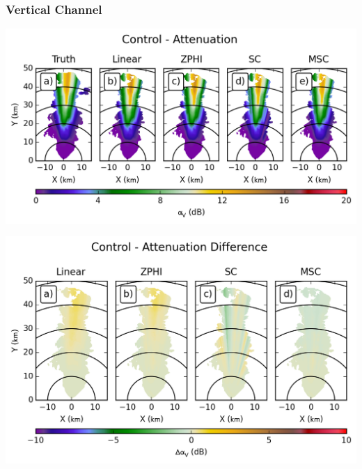 \documentclass[red]{beamer}
\begin{document}
\subsubsection{Vertical Channel}
\begin{frame}
    \begin{center}
        \includegraphics[scale=0.7]{figures/C_Control_Attenuation_V}
    \end{center}
\end{frame}

\begin{frame}
    \begin{center}
        \includegraphics[scale=0.7]{figures/C_Control_Attenuation_Difference_V}
    \end{center}
\end{frame}
\end{document}
